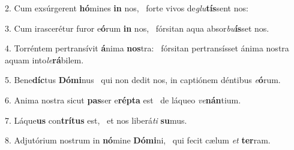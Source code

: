 2. Cum exsúrgerent \textbf{hó}mines \textbf{in} nos, \ast\  forte vivos de\textit{glu}\textbf{tís}sent nos:\

3. Cum irascerétur furor e\textbf{ó}rum \textbf{in} nos, \ast\  fórsitan aqua absor\textit{bu}\textbf{ís}set nos.\

4. Torréntem pertransívit \textbf{á}nima \textbf{nos}tra: \ast\  fórsitan pertransísset ánima nostra aquam into\textit{le}\textbf{rá}bilem.\

5. Bene\textbf{díc}tus \textbf{Dó}\textbf{mi}nus \ast\  qui non dedit nos, in captiónem déntibus \textit{e}\textbf{ó}rum.\

6. Anima nostra sicut \textbf{pas}ser e\textbf{rép}\textbf{ta} est \ast\  de láqueo \textit{ve}\textbf{nán}tium.\

7. Láque\textbf{us} con\textbf{trí}\textbf{tus} est, \ast\  et nos liberá\textit{ti} \textbf{su}mus.\

8. Adjutórium nostrum in \textbf{nó}mine \textbf{Dó}\textbf{mi}ni, \ast\  qui fecit cælum \textit{et} \textbf{ter}ram.\

